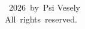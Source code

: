 \vspace*{3in}
\begin{singlespace}
	\begin{center}
		\textcopyright{}~2026~by~Psi Vesely\\
		All~rights~reserved.
	\end{center}
\end{singlespace}